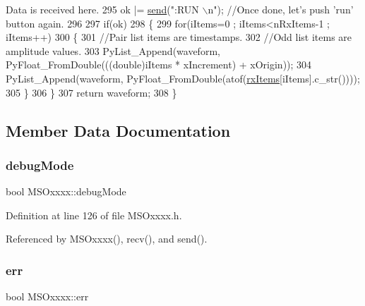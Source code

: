 \begin{DoxyCode}
{      Data is received here.}
295     ok |= \hyperlink{classMSOxxxx_ae77668a1ae4ccb74e0ed5f2485dfdebf}{send}(\textcolor{stringliteral}{":RUN \(\backslash\)n"});                                                                  \textcolor{comment}{//Once
       done, let's push 'run' button again.}
296 
297     \textcolor{keywordflow}{if}(ok)
298     \{
299         \textcolor{keywordflow}{for}(iItems=0 ; iItems<nRxItems-1 ; iItems++)
300         \{
301             \textcolor{comment}{//Pair list items are timestamps.}
302             \textcolor{comment}{//Odd  list items are amplitude values.}
303             PyList\_Append(waveform, PyFloat\_FromDouble(((\textcolor{keywordtype}{double})iItems * xIncrement) + xOrigin));
304             PyList\_Append(waveform, PyFloat\_FromDouble(atof(\hyperlink{classMSOxxxx_a847cae37181e9ec5f481edcc3fb19b1a}{rxItems}[iItems].c\_str())));
305         \}
306     \}
307     \textcolor{keywordflow}{return} waveform;
308 \}
\end{DoxyCode}


\subsection{Member Data Documentation}
\mbox{\label{classMSOxxxx_a826ba82e93bbe5780169107a31dbfd29}} 
\subsubsection{\texorpdfstring{debug\+Mode}{debugMode}}
{\footnotesize\ttfamily bool M\+S\+Oxxxx\+::debug\+Mode\hspace{0.3cm}{\ttfamily [private]}}



Definition at line 126 of file M\+S\+Oxxxx.\+h.



Referenced by M\+S\+Oxxxx(), recv(), and send().

\mbox{\label{classMSOxxxx_af0af7ac8123ee93917d0e92ec947acaa}} 
\subsubsection{\texorpdfstring{err}{err}}
{\footnotesize\ttfamily bool M\+S\+Oxxxx\+::err\hspace{0.3cm}{\ttfamily [private]}}



